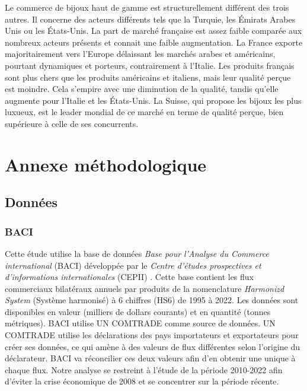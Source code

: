 \documentclass[french,10pt,a4paper]{article}
\begin{document}
Le commerce de bijoux haut de gamme est structurellement différent des trois autres. Il concerne des acteurs différents tels que la Turquie, les Émirats Arabes Unis ou les États-Unis. La part de marché française est assez faible comparée aux nombreux acteurs présents et connait une faible augmentation. La France exporte majoritairement vers l'Europe délaissant les marchés arabes et américains, pourtant dynamiques et porteurs, contrairement à l'Italie. Les produits français sont plus chers que les produits américains et italiens, mais leur qualité perçue est moindre. Cela s'empire avec une diminution de la qualité, tandis qu'elle augmente pour l'Italie et les États-Unis. La Suisse, qui propose les bijoux les plus luxueux, est le leader mondial de ce marché en terme de qualité perçue, bien supérieure à celle de ses concurrents.



\newpage

\section*{Annexe méthodologique}
\subsection*{Données}
\subsubsection*{BACI}
Cette étude utilise la base de données \textit{Base pour l'Analyse du Commerce international} (BACI) développée par le \textit{Centre d'études prospectives et d'informations internationales} (CEPII) \citep{Gaulier2010}. Cette base contient les flux commerciaux bilatéraux annuels par produits de la nomenclature \textit{Harmonizd System} (Système harmonisé) à 6 chiffres (HS6) de 1995 à 2022. Les données sont disponibles en valeur (milliers de dollars courants) et en quantité (tonnes métriques). BACI utilise UN COMTRADE comme source de données. UN COMTRADE utilise les déclarations des pays importateurs et exportateurs pour créer ses données, ce qui amène à des valeurs de flux différentes selon l'origine du déclarateur. BACI va réconcilier ces deux valeurs afin d'en obtenir une unique à chaque flux. Notre analyse se restreint à l'étude de la période 2010-2022 afin d'éviter la crise économique de 2008 et se concentrer sur la période récente.
\end{document}
